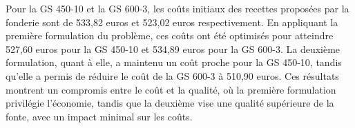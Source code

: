 \documentclass[12pt]{article}
\begin{document}
Pour la GS 450-10 et la GS 600-3, les coûts initiaux des recettes 
proposées par la fonderie sont de 533,82 euros et 523,02 euros 
respectivement. En appliquant la première formulation du problème, 
ces coûts ont été optimisés pour atteindre 527,60 euros pour la GS 450-10 
et 534,89 euros pour la GS 600-3. La deuxième formulation, quant à elle, 
a maintenu un coût proche pour la GS 450-10, tandis qu'elle a permis de 
réduire le coût de la GS 600-3 à 510,90 euros.
Ces résultats montrent un compromis entre le coût et la qualité, où la 
première formulation privilégie l'économie, tandis que la deuxième vise 
une qualité supérieure de la fonte, avec un impact minimal sur les coûts.

\end{document}

